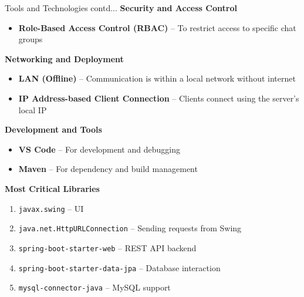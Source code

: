 \documentclass[aspectratio=1610]{beamer}
\begin{document}
\begin{frame}{Tools and Technologies contd...}
\small
\vspace{0.2cm}
\textbf{Security and Access Control}
\begin{itemize}
  \item \textbf{Role-Based Access Control (RBAC)} – To restrict access to specific chat groups
\end{itemize}
\vspace{0.2cm}
\textbf{Networking and Deployment}
\begin{itemize}
  \item \textbf{LAN (Offline)} – Communication is within a local network without internet
  \item \textbf{IP Address-based Client Connection} – Clients connect using the server's local IP
\end{itemize}
\vspace{0.2cm}
\textbf{Development and Tools}
\begin{itemize}
  \item \textbf{VS Code} – For development and debugging
  \item \textbf{Maven } – For dependency and build management
\end{itemize}
\textbf{Most Critical Libraries}
\begin{enumerate}
    \item \texttt{javax.swing} – UI
    \item \texttt{java.net.HttpURLConnection} – Sending requests from Swing
    \item \texttt{spring-boot-starter-web} – REST API backend
    \item \texttt{spring-boot-starter-data-jpa} – Database interaction
    \item \texttt{mysql-connector-java} – MySQL support
\end{enumerate}
\end{frame}
\end{document}
